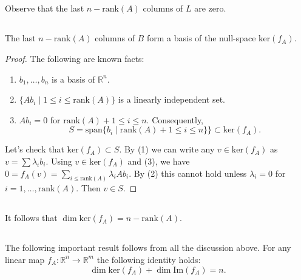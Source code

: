 \documentclass{proc-l}
\theoremstyle{definition}
\theoremstyle{remark}
\numberwithin{equation}{section}
\newcommand{\R}{\mathbb{R}}
\newcommand{\rank}[1]{\textrm{rank}({#1})}
\newcommand{\im}[1]{\textrm{Im}({#1})}
\renewcommand{\ker}[1]{\textrm{ker}({#1})}
\renewcommand{\span}[1]{\textrm{span}\{ {#1} \}}
\begin{document}
\subsection{}
Observe that the last $n - \rank{A}$ columns of $L$ are zero.

\subsection{}
The last $n - \rank{A}$ columns of $B$ form a basis of the null-space $\ker{f_A}$. 
\begin{proof}
The following are known facts:
\begin{enumerate}
\item $b_1, \ldots, b_n$ is a basis of $\R^n$.
\item $\{Ab_i\;|\; 1\leq i\leq \rank{A}\}$ is a linearly independent set.
\item $Ab_i = 0$ for $\rank{A} + 1\leq i\leq n$. Consequently, 
\[
S=\span{b_i\;|\; \rank{A} + 1\leq i \leq n} \} \subset \ker{f_A}.
\]
\end{enumerate}
Let's check that $\ker{f_A} \subset S$. By (1) we can write any $v\in\ker{f_A}$ as $v=\sum\lambda_i b_i$. Using $v\in\ker{f_A}$ and (3), we have $0 = f_A (v) = \sum_{i\leq\rank{A}} \lambda_i Ab_i$. By (2) this cannot hold unless $\lambda_i = 0$ for $i=1,\ldots, \rank{A}$. Then $v\in S$.
\end{proof}

\subsection{}
It follows that $\dim{\ker{f_A}} = n - \rank{A}$.


\subsection{}
The following important result follows from all the discussion above. For any linear map $f_A:\R^n\to\R^m$ the following identity holds:
\[
\dim{\ker{f_A}} + \dim{\im{f_A}} = n.
\]



\end{document}
